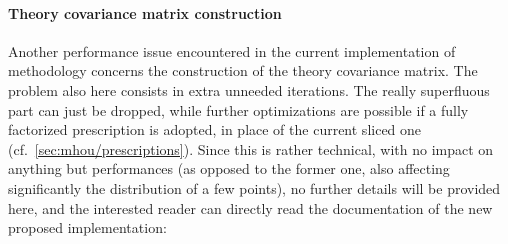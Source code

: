 \paragraph{Theory covariance matrix construction} Another performance issue
encountered in the current implementation of \nnpdf methodology concerns the
construction of the theory covariance matrix.
%
The problem also here consists in extra unneeded iterations. 
The really superfluous part can just be dropped, while further optimizations
are possible if a fully factorized prescription is adopted, in place of the
current sliced one (cf.\ \cref{sec:mhou/prescriptions}).
%
Since this is rather technical, with no impact on anything but performances (as
opposed to the former one, also affecting significantly the distribution of a
few points), no further details will be provided here, and the interested
reader can directly read the documentation of the new proposed implementation:
\begin{center}
\end{center}
